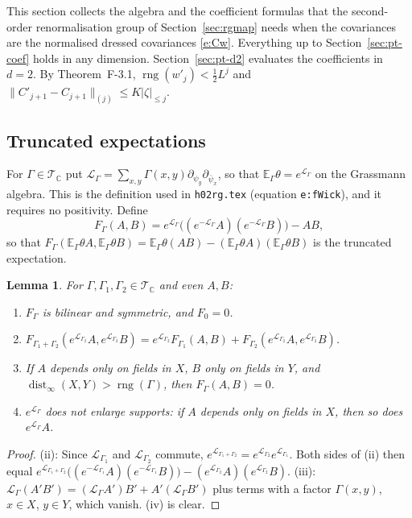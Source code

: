 \documentclass[11pt]{amsart}
\newtheorem{lemma}[theorem]{Lemma}
\theoremstyle{definition}
\theoremstyle{remark}
\numberwithin{equation}{section}
\newcommand{\C}{\mathbb{C}}
\newcommand{\E}{\mathbb{E}}
\newcommand{\cL}{\mathcal{L}}
\newcommand{\cT}{\mathcal{T}}
\newcommand{\rng}{\operatorname{rng}}
\newcommand{\hr}{\texttt{h02rg.tex}}
\begin{document}
This section collects the algebra and the coefficient formulas that the second-order
renormalisation group of Section~\ref{sec:rgmap} needs when the covariances are the normalised
dressed covariances \eqref{e:Cw}. Everything up to Section~\ref{sec:pt-coef} holds in any
dimension. Section~\ref{sec:pt-d2} evaluates the coefficients in $d=2$. By Theorem~F-3.1,
$\rng(w'_j)<\frac12L^j$ and $\|C'_{j+1}-C_{j+1}\|_{(j)}\le K|\zeta|_{\le j}$.

\subsection{Truncated expectations}
For $\Gamma\in\cT_\C$ put $\cL_\Gamma=\sum_{x,y}\Gamma(x,y)\partial_{\psi_y}\partial_{\bar\psi_x}$,
so that $\E_\Gamma\theta=e^{\cL_\Gamma}$ on the Grassmann algebra. This is the definition
used in \hr{} (equation \texttt{e:fWick}), and it requires no positivity. Define
\[
  F_\Gamma(A,B)=e^{\cL_\Gamma}\bigl((e^{-\cL_\Gamma}A)(e^{-\cL_\Gamma}B)\bigr)-AB ,
\]
so that $F_\Gamma(\E_\Gamma\theta A,\E_\Gamma\theta B)=\E_\Gamma\theta(AB)-(\E_\Gamma\theta A)(\E_\Gamma\theta B)$
is the truncated expectation.

\begin{lemma}\label{lem:F}
For $\Gamma,\Gamma_1,\Gamma_2\in\cT_\C$ and even $A,B$:
\begin{enumerate}[label=(\roman*)]
\item $F_\Gamma$ is bilinear and symmetric, and $F_0=0$.
\item $F_{\Gamma_1+\Gamma_2}(e^{\cL_{\Gamma_2}}A,e^{\cL_{\Gamma_2}}B)
  =e^{\cL_{\Gamma_2}}F_{\Gamma_1}(A,B)+F_{\Gamma_2}(e^{\cL_{\Gamma_2}}A,e^{\cL_{\Gamma_2}}B)$.
\item If $A$ depends only on fields in $X$, $B$ only on fields in $Y$, and
  $\operatorname{dist}_\infty(X,Y)>\rng(\Gamma)$, then $F_\Gamma(A,B)=0$.
\item $e^{\cL_\Gamma}$ does not enlarge supports: if $A$ depends only on fields in $X$,
  then so does $e^{\cL_\Gamma}A$.
\end{enumerate}
\end{lemma}

\begin{proof}
(ii): Since $\cL_{\Gamma_1}$ and $\cL_{\Gamma_2}$ commute,
$e^{\cL_{\Gamma_1+\Gamma_2}}=e^{\cL_{\Gamma_2}}e^{\cL_{\Gamma_1}}$. Both
sides of (ii) then equal
$e^{\cL_{\Gamma_1+\Gamma_2}}\bigl((e^{-\cL_{\Gamma_1}}A)(e^{-\cL_{\Gamma_1}}B)\bigr)-(e^{\cL_{\Gamma_2}}A)(e^{\cL_{\Gamma_2}}B)$.
(iii): $\cL_\Gamma(A'B')=(\cL_\Gamma A')B'+A'(\cL_\Gamma B')$ plus terms with
a factor $\Gamma(x,y)$, $x\in X$, $y\in Y$, which vanish. (iv) is clear.
\end{proof}
\end{document}
